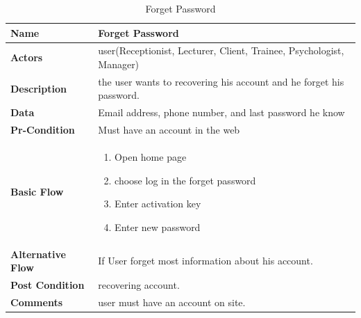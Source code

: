 \documentclass[../Psychological_system_web_application.tex]{subfiles}
\begin{document}
	\begin{center}
		\begin{table}[h!]
			\begin{tabular}{ | m{4cm} | m{10cm}| } 
				\hline
			 	\textbf{\large Name}& Forget Password\\
			 	
				\hline
			  	\textbf{\large Actors}& user(Receptionist, Lecturer, Client, Trainee, Psychologist, Manager)\\ 
								
				\hline
			  	\textbf{\large Description}& the user wants to recovering his account and he forget his password.\\
			  	 
				\hline
				\textbf{\large Data}&Email address, phone number, and last password he know\\ 
				
				\hline
				 \textbf{\large Pr-Condition}& Must have an account in the web \\
				
				\hline
				\textbf{\large Basic Flow}&\begin{enumerate}
				\item
					Open home page
				\item
					choose log in the forget password
				\item
					Enter activation key
				\item
					Enter new password  \end{enumerate}				 \\
				
				\hline
				\textbf{\large Alternative Flow}& If User forget most information about his account.\\ 
								
				\hline
				\textbf{\large Post Condition}& recovering account.\\ 
								
				\hline
				\textbf{\large Comments}& user must have an account on site.\\ 
				\hline
			\end{tabular}
			\caption{Forget Password}
			\label{table:FORGET-PASSWORD}
		\end{table}
	\end{center}
\end{document}
